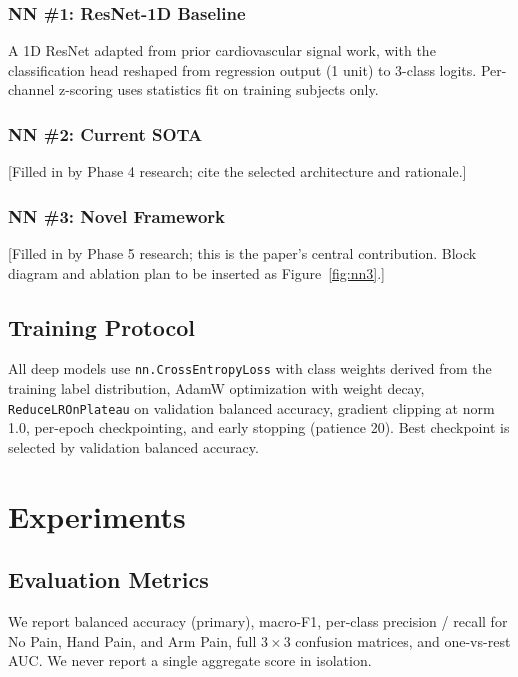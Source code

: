 \documentclass[conference]{IEEEtran}
\begin{document}
\subsubsection{NN \#1: ResNet-1D Baseline}
A 1D ResNet adapted from prior cardiovascular signal work, with the
classification head reshaped from regression output (1 unit) to 3-class
logits. Per-channel z-scoring uses statistics fit on training subjects only.

\subsubsection{NN \#2: Current SOTA}
[Filled in by Phase 4 research; cite the selected architecture and rationale.]

\subsubsection{NN \#3: Novel Framework}
[Filled in by Phase 5 research; this is the paper's central contribution.
Block diagram and ablation plan to be inserted as Figure~\ref{fig:nn3}.]

\subsection{Training Protocol}
All deep models use \texttt{nn.CrossEntropyLoss} with class weights derived
from the training label distribution, AdamW optimization with weight decay,
\texttt{ReduceLROnPlateau} on validation balanced accuracy, gradient clipping
at norm 1.0, per-epoch checkpointing, and early stopping (patience 20). Best
checkpoint is selected by validation balanced accuracy.

\section{Experiments}

\subsection{Evaluation Metrics}
We report balanced accuracy (primary), macro-F1, per-class precision / recall
for No Pain, Hand Pain, and Arm Pain, full $3 \times 3$ confusion matrices,
and one-vs-rest AUC. We never report a single aggregate score in isolation.
\end{document}
